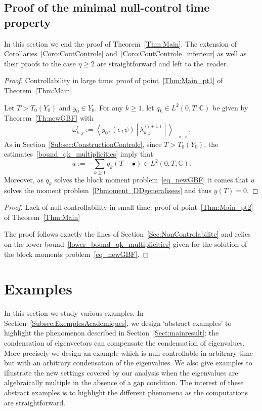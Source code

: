 \documentclass[11pt]{article}
\theoremstyle{definition}
\numberwithin{equation}{section}
\numberwithin{figure}{section}
\numberwithin{table}{section}
\newcommand{\Fzp}{Y_0}
\newcommand{\dual}[2]{\left\langle #1, #2 \right\rangle_{-\diamond,\diamond}}
\newcommand{\C}{\mathbb{C}}
\renewcommand{\cdot}{{\scriptstyle \bullet}}
\begin{document}
\subsection{Proof of the minimal null-control time property} \label{Subsec:NC_DDgeneralisees}


In this section we end the proof of Theorem~\ref{Thm:Main}. The extension of Corollaries~\ref{Coro:CoutControle} and~\ref{Coro:CoutControle_inferieur} as well as their proofs to the case $\eta \geq 2$ are straightforward and left to the~reader.

\begin{proof}{Controllability in large time: proof of point~\eqref{Thm:Main_pt1} of Theorem~\ref{Thm:Main}}


Let $T> T_0(\Fzp)$ and $y_0 \in \Fzp$. For any $k \geq 1$, let $q_k \in L^2(0,T ; \C)$ be given by Theorem~\ref{Th:newGBF} with
\[
\omega_{k,j}^l := \dual{y_0}{(e_T \psi) [\lambda_{k,j}^{(l+1)}] }.
\]
As in Section~\ref{Subsec:ConstructionControle}, since $T >T_0(\Fzp)$, the estimates~\eqref{bound_qk_multiplicities} imply that
\[
u := -\sum_{k \geq 1} q_k (T-\cdot) \in L^2(0,T ; \C).
\]
Moreover, as $q_k$ solves the block moment problem~\eqref{eq_newGBF} it comes that $u$ solves the moment problem~\eqref{Pbmoment_DDgeneralisees} and thus $y(T)=0$.
\end{proof}



\begin{proof}{Lack of null-controllability in small time: proof of point~\eqref{Thm:Main_pt2} of Theorem~\ref{Thm:Main}}

The proof follows exactly the lines of Section~\ref{Sec:NonControlabilite} and relies on the lower bound~\eqref{lower_bound_qk_multiplicities} given for the solution of the block moments problem~\eqref{eq_newGBF}.
\end{proof}



\section{Examples}\label{Sec:Examples}

In this section we study various examples. In Section~\ref{Subsec:ExemplesAcademiques}, we design `abstract examples' to highlight the phenomenon described in Section~\ref{Sect:mainresult}: the condensation of eigenvectors can compensate the condensation of eigenvalues. More precisely we design an example which is null-controllable in arbitrary time but with an arbitrary condensation of the eigenvalues. We also give examples to illustrate the new settings covered by our analysis when the eigenvalues are algebraically multiple in the absence of a gap condition. The interest of these abstract examples is to highlight the different phenomena as the computations are straightforward.
\end{document}
